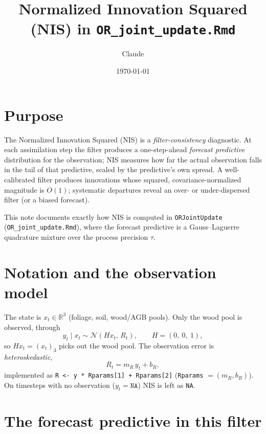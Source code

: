 \documentclass{article}
\title{Normalized Innovation Squared (NIS) in \texttt{OR\_joint\_update.Rmd}}
\author{Claude}
\date{\today}
\newcommand{\R}{\mathbb{R}}
\newcommand{\Norm}{\mathcal{N}}
\begin{document}
\maketitle

\section{Purpose}

The Normalized Innovation Squared (NIS) is a \emph{filter-consistency} diagnostic. At
each assimilation step the filter produces a one-step-ahead \emph{forecast predictive}
distribution for the observation; NIS measures how far the actual observation falls in
the tail of that predictive, scaled by the predictive's own spread. A well-calibrated
filter produces innovations whose squared, covariance-normalized magnitude is $O(1)$;
systematic departures reveal an over- or under-dispersed filter (or a biased forecast).

This note documents exactly how NIS is computed in \texttt{ORJointUpdate}
(\texttt{OR\_joint\_update.Rmd}), where the forecast predictive is a Gauss--Laguerre
quadrature mixture over the process precision $\tau$.

\section{Notation and the observation model}

The state is $x_t \in \R^3$ (foliage, soil, wood/AGB pools). Only the wood pool is
observed, through
\[
  y_t \mid x_t \sim \Norm(H x_t,\, R_t), \qquad H = (0,\ 0,\ 1),
\]
so $H x_t = (x_t)_3$ picks out the wood pool. The observation error is
\emph{heteroskedastic},
\[
  R_t = m_R\, y_t + b_R,
\]
implemented as \lstinline{R <- y * Rparams[1] + Rparams[2]} (\lstinline{Rparams} $=
(m_R, b_R)$). On timesteps with no observation ($y_t = \texttt{NA}$) NIS is left as
\texttt{NA}.

\section{The forecast predictive in this filter}
\end{document}
